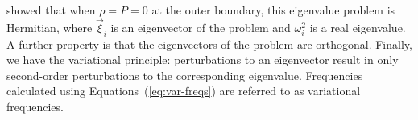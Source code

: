 \citet{1964ApJ...139..664C} 
showed that when $\rho=P=0$ at the outer boundary, this eigenvalue problem is Hermitian, 
where $\vec\xi_i$ %
is an eigenvector of the problem and $\omega^2_i$ %
is a real eigenvalue. 
A further property is that the eigenvectors of the problem are orthogonal. 
Finally, we have the variational principle: perturbations to an eigenvector result in only second-order perturbations to the corresponding eigenvalue. %
Frequencies calculated using Equations~(\ref{eq:var-freqs}) are referred to as variational frequencies. 

